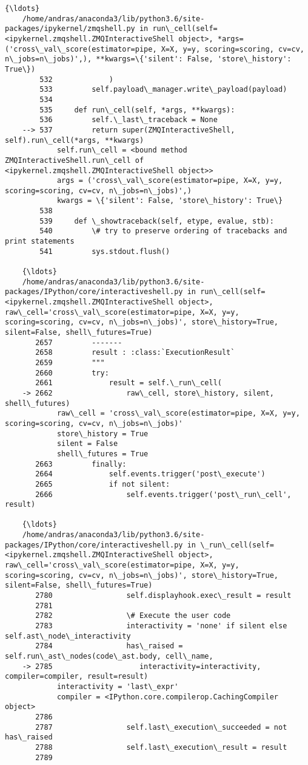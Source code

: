 \documentclass[11pt]{article}
\begin{document}
\begin{Verbatim}[commandchars=\\\{\}]
    {\ldots}
    /home/andras/anaconda3/lib/python3.6/site-packages/ipykernel/zmqshell.py in run\_cell(self=<ipykernel.zmqshell.ZMQInteractiveShell object>, *args=('cross\_val\_score(estimator=pipe, X=X, y=y, scoring=scoring, cv=cv, n\_jobs=n\_jobs)',), **kwargs=\{'silent': False, 'store\_history': True\})
        532             )
        533         self.payload\_manager.write\_payload(payload)
        534 
        535     def run\_cell(self, *args, **kwargs):
        536         self.\_last\_traceback = None
    --> 537         return super(ZMQInteractiveShell, self).run\_cell(*args, **kwargs)
            self.run\_cell = <bound method ZMQInteractiveShell.run\_cell of <ipykernel.zmqshell.ZMQInteractiveShell object>>
            args = ('cross\_val\_score(estimator=pipe, X=X, y=y, scoring=scoring, cv=cv, n\_jobs=n\_jobs)',)
            kwargs = \{'silent': False, 'store\_history': True\}
        538 
        539     def \_showtraceback(self, etype, evalue, stb):
        540         \# try to preserve ordering of tracebacks and print statements
        541         sys.stdout.flush()
    
    {\ldots}
    /home/andras/anaconda3/lib/python3.6/site-packages/IPython/core/interactiveshell.py in run\_cell(self=<ipykernel.zmqshell.ZMQInteractiveShell object>, raw\_cell='cross\_val\_score(estimator=pipe, X=X, y=y, scoring=scoring, cv=cv, n\_jobs=n\_jobs)', store\_history=True, silent=False, shell\_futures=True)
       2657         -------
       2658         result : :class:`ExecutionResult`
       2659         """
       2660         try:
       2661             result = self.\_run\_cell(
    -> 2662                 raw\_cell, store\_history, silent, shell\_futures)
            raw\_cell = 'cross\_val\_score(estimator=pipe, X=X, y=y, scoring=scoring, cv=cv, n\_jobs=n\_jobs)'
            store\_history = True
            silent = False
            shell\_futures = True
       2663         finally:
       2664             self.events.trigger('post\_execute')
       2665             if not silent:
       2666                 self.events.trigger('post\_run\_cell', result)
    
    {\ldots}
    /home/andras/anaconda3/lib/python3.6/site-packages/IPython/core/interactiveshell.py in \_run\_cell(self=<ipykernel.zmqshell.ZMQInteractiveShell object>, raw\_cell='cross\_val\_score(estimator=pipe, X=X, y=y, scoring=scoring, cv=cv, n\_jobs=n\_jobs)', store\_history=True, silent=False, shell\_futures=True)
       2780                 self.displayhook.exec\_result = result
       2781 
       2782                 \# Execute the user code
       2783                 interactivity = 'none' if silent else self.ast\_node\_interactivity
       2784                 has\_raised = self.run\_ast\_nodes(code\_ast.body, cell\_name,
    -> 2785                    interactivity=interactivity, compiler=compiler, result=result)
            interactivity = 'last\_expr'
            compiler = <IPython.core.compilerop.CachingCompiler object>
       2786                 
       2787                 self.last\_execution\_succeeded = not has\_raised
       2788                 self.last\_execution\_result = result
       2789 
    

\end{Verbatim}
\end{document}
